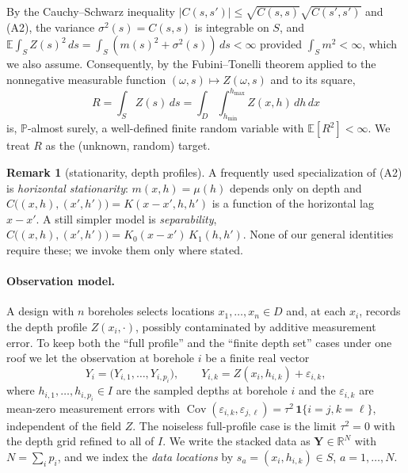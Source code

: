 \documentclass{amsart}
\theoremstyle{definition}
\newtheorem{remark}[theorem]{Remark}
\newcommand{\R}{\mathbb{R}}
\newcommand{\E}{\mathbb{E}}
\newcommand{\Cov}{\operatorname{Cov}}
\begin{document}
By the Cauchy--Schwarz inequality $|C(s,s')|\le
\sqrt{C(s,s)}\sqrt{C(s',s')}$ and (A2), the variance
$\sigma^2(s)=C(s,s)$ is integrable on $S$, and $\E\!\int_S Z(s)^2\,ds
=\int_S(m(s)^2+\sigma^2(s))\,ds<\infty$ provided $\int_S m^2<\infty$, which
we also assume. Consequently, by the Fubini--Tonelli theorem applied to the
nonnegative measurable function $(\omega,s)\mapsto Z(\omega,s)$ and to its
square,
\begin{equation}\label{eq:Rwelldef}
R=\int_S Z(s)\,ds=\int_D\!\int_{h_{\min}}^{h_{\max}}Z(x,h)\,dh\,dx
\end{equation}
is, $\mathbb P$-almost surely, a well-defined finite random variable with
$\E[R^2]<\infty$. We treat $R$ as the (unknown, random) target.

\begin{remark}[stationarity, depth profiles]
A frequently used specialization of (A2) is \emph{horizontal
stationarity}: $m(x,h)=\mu(h)$ depends only on depth and
$C\big((x,h),(x',h')\big)=K(x-x',h,h')$ is a function of the horizontal
lag $x-x'$. A still simpler model is \emph{separability},
$C\big((x,h),(x',h')\big)=K_0(x-x')\,K_1(h,h')$. None of our general
identities require these; we invoke them only where stated.
\end{remark}

\paragraph{Observation model.} A design with $n$ boreholes selects
locations $x_1,\dots,x_n\in D$ and, at each $x_i$, records the depth
profile $Z(x_i,\cdot)$, possibly contaminated by additive measurement
error. To keep both the ``full profile'' and the ``finite depth set''
cases under one roof we let the observation at borehole $i$ be a finite
real vector
\begin{equation}\label{eq:obsmodel}
Y_{i}=\big(Y_{i,1},\dots,Y_{i,p_i}\big),\qquad
Y_{i,k}=Z(x_i,h_{i,k})+\varepsilon_{i,k},
\end{equation}
where $h_{i,1},\dots,h_{i,p_i}\in I$ are the sampled depths at borehole
$i$ and the $\varepsilon_{i,k}$ are mean-zero measurement errors with
$\Cov(\varepsilon_{i,k},\varepsilon_{j,\ell})
=\tau^2\,\mathbf 1\{i=j,k=\ell\}$, independent of the field $Z$. The
noiseless full-profile case is the limit $\tau^2=0$ with the depth grid
refined to all of $I$. We write the stacked data as
$\mathbf Y\in\R^{N}$ with $N=\sum_i p_i$, and we index the
\emph{data locations} by $s_a=(x_{i},h_{i,k})\in S$, $a=1,\dots,N$.
\end{document}
